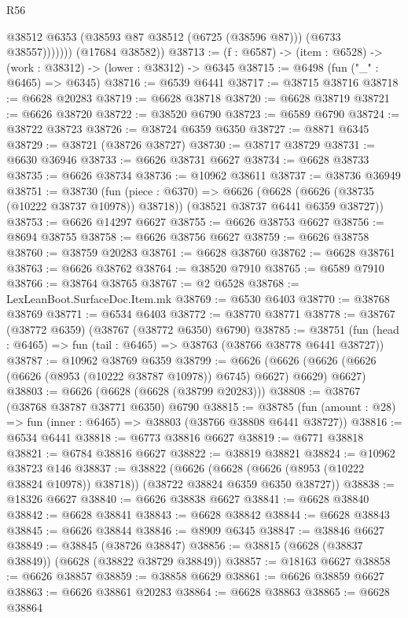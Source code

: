 \begin{lexlean}{R56}
\begin{coremodule}
                  @38512
                  @6353
                  (@38593 @87 @38512 (@6725 (@38596 @87)))
                  (@6733 @38557)))))))
      (@17684 @38582))
@38713 := (f : @6587) -> (item : @6528) -> (work : @38312) -> (lower : @38312) -> @6345
@38715 := @6498 (fun ("_" : @6465) => @6345)
@38716 := @6539 @6441
@38717 := @38715 @38716
@38718 := @6628 @20283
@38719 := @6628 @38718
@38720 := @6628 @38719
@38721 := @6626 @38720
@38722 := @38520 @6790
@38723 := @6589 @6790
@38724 := @38722 @38723
@38726 := @38724 @6359 @6350
@38727 := @8871 @6345
@38729 := @38721 (@38726 @38727)
@38730 := @38717 @38729
@38731 := @6630 @36946
@38733 := @6626 @38731 @6627
@38734 := @6628 @38733
@38735 := @6626 @38734
@38736 := @10962 @38611
@38737 := @38736 @36949
@38751 := @38730
    (fun (piece : @6370) =>
    @6626 (@6628 (@6626 (@38735 (@10222 @38737 @10978)) @38718)) (@38521 @38737 @6441 @6359 @38727))
@38753 := @6626 @14297 @6627
@38755 := @6626 @38753 @6627
@38756 := @8694 @38755
@38758 := @6626 @38756 @6627
@38759 := @6626 @38758
@38760 := @38759 @20283
@38761 := @6628 @38760
@38762 := @6628 @38761
@38763 := @6626 @38762
@38764 := @38520 @7910
@38765 := @6589 @7910
@38766 := @38764 @38765
@38767 := @2 @6528
@38768 := LexLeanBoot.SurfaceDoc.Item.mk
@38769 := @6530 @6403
@38770 := @38768 @38769
@38771 := @6534 @6403
@38772 := @38770 @38771
@38778 := @38767 (@38772 @6359) (@38767 (@38772 @6350) @6790)
@38785 := @38751 (fun (head : @6465) => fun (tail : @6465) => @38763 (@38766 @38778 @6441 @38727))
@38787 := @10962 @38769 @6359
@38799 := @6626
    (@6626 (@6626 (@6626 (@6626 (@8953 (@10222 @38787 @10978)) @6745) @6627) @6629) @6627)
@38803 := @6626 (@6628 (@6628 (@38799 @20283)))
@38808 := @38767 (@38768 @38787 @38771 @6350) @6790
@38815 := @38785 (fun (amount : @28) => fun (inner : @6465) => @38803 (@38766 @38808 @6441 @38727))
@38816 := @6534 @6441
@38818 := @6773 @38816 @6627
@38819 := @6771 @38818
@38821 := @6784 @38816 @6627
@38822 := @38819 @38821
@38824 := @10962 @38723 @146
@38837 := @38822
    (@6626 (@6628 (@6626 (@8953 (@10222 @38824 @10978)) @38718)) (@38722 @38824 @6359 @6350 @38727))
@38838 := @18326 @6627
@38840 := @6626 @38838 @6627
@38841 := @6628 @38840
@38842 := @6628 @38841
@38843 := @6628 @38842
@38844 := @6628 @38843
@38845 := @6626 @38844
@38846 := @8909 @6345
@38847 := @38846 @6627
@38849 := @38845 (@38726 @38847)
@38856 := @38815 (@6628 (@38837 @38849)) (@6628 (@38822 @38729 @38849))
@38857 := @18163 @6627
@38858 := @6626 @38857
@38859 := @38858 @6629
@38861 := @6626 @38859 @6627
@38863 := @6626 @38861 @20283
@38864 := @6628 @38863
@38865 := @6628 @38864

\end{coremodule}
\end{lexlean}
